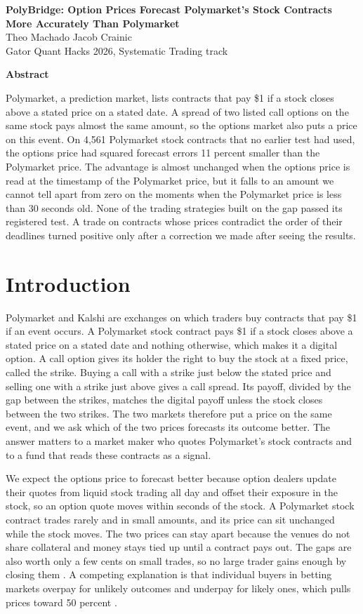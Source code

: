 \documentclass[11pt]{article}
\begin{document}
\begin{center}
{\large\bfseries PolyBridge: Option Prices Forecast Polymarket's Stock Contracts More Accurately Than Polymarket}\\[0.5ex]
{Theo Machado \quad Jacob Crainic}\\[0.1ex]
{Gator Quant Hacks 2026, Systematic Trading track}
\end{center}
{\centering\textbf{Abstract}\par}
Polymarket, a prediction market, lists contracts that pay \$1 if a stock closes above a stated price on a stated date. A spread of two listed call options on the same stock pays almost the same amount, so the options market also puts a price on this event. On 4,561 Polymarket stock contracts that no earlier test had used, the options price had squared forecast errors 11 percent smaller than the Polymarket price. The advantage is almost unchanged when the options price is read at the timestamp of the Polymarket price, but it falls to an amount we cannot tell apart from zero on the moments when the Polymarket price is less than 30 seconds old. None of the trading strategies built on the gap passed its registered test. A trade on contracts whose prices contradict the order of their deadlines turned positive only after a correction we made after seeing the results.

\section{Introduction}\label{sec:intro}
Polymarket and Kalshi are exchanges on which traders buy contracts that pay \$1 if an event occurs. A Polymarket stock contract pays \$1 if a stock closes above a stated price on a stated date and nothing otherwise, which makes it a digital option. A call option gives its holder the right to buy the stock at a fixed price, called the strike. Buying a call with a strike just below the stated price and selling one with a strike just above gives a call spread. Its payoff, divided by the gap between the strikes, matches the digital payoff unless the stock closes between the two strikes. The two markets therefore put a price on the same event, and we ask which of the two prices forecasts its outcome better. The answer matters to a market maker who quotes Polymarket's stock contracts and to a fund that reads these contracts as a signal.

We expect the options price to forecast better because option dealers update their quotes from liquid stock trading all day and offset their exposure in the stock, so an option quote moves within seconds of the stock. A Polymarket stock contract trades rarely and in small amounts, and its price can sit unchanged while the stock moves. The two prices can stay apart because the venues do not share collateral and money stays tied up until a contract pays out. The gaps are also worth only a few cents on small trades, so no large trader gains enough by closing them \citep{shleifer1997}. A competing explanation is that individual buyers in betting markets overpay for unlikely outcomes and underpay for likely ones, which pulls prices toward 50 percent \citep{snowberg2010}.
\end{document}
